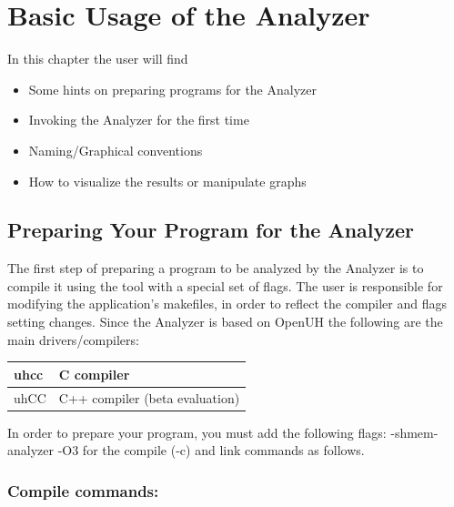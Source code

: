 \section{Basic Usage of the \openshmem Analyzer}
\label{chapter:basic-usage}

In this chapter the user will find

\begin{itemize}
\item Some hints on preparing programs for the \openshmem Analyzer
\item Invoking the \openshmem Analyzer for the first time
\item Naming/Graphical conventions
\item How to visualize the results or manipulate graphs
\end{itemize}

\subsection{Preparing Your Program for the \openshmem Analyzer}

The first step of preparing a program to be analyzed by the \openshmem
Analyzer is to compile it using the tool with a special set of
flags. The user is responsible for modifying the application's
makefiles, in order to reflect the compiler and flags setting
changes. Since the \openshmem Analyzer is based on OpenUH the
following are the main drivers/compilers:

\vspace{0.1in}

\begin{center}
  \begin{tabular}{|l | l |}
    \hline
    uhcc & C compiler \\
    \hline
    uhCC & C++ compiler (beta evaluation) \\
    \hline
  \end{tabular}
\end{center}

\vspace{0.1in}

In order to prepare your program, you must add the following flags:
-shmem-analyzer -O3 for the compile (-c) and link commands as follows.

\subsubsection*{Compile commands:}

